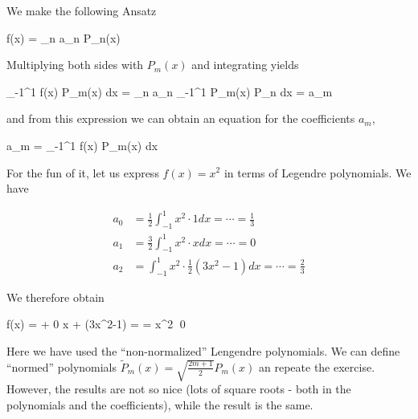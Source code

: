 We make the following Ansatz

\bee
f(x) = \sum_n a_n P_n(x)
\eee

Multiplying both sides with $P_m(x)$ and integrating yields

\bee
\int_{-1}^1 f(x) P_m(x) dx = \sum_n a_n \int_{-1}^1 P_m(x) P_n dx =  a_m
\eee

and from this expression we can obtain an equation for the coefficients $a_m$,

\bee
a_m =  \int_{-1}^1 f(x) P_m(x) dx
\eee

For the fun of it, let us express $f(x)=x^2$ in terms of Legendre polynomials. We have

\begin{align*}
  a_0 &= \frac{1}{2} \int_{-1}^1 x^2 \cdot 1 dx = \cdots = \frac{1}{3}\\
  a_1 &= \frac{3}{2} \int_{-1}^1 x^2 \cdot x dx = \cdots = 0\\
  a_2 &= \int_{-1}^1 x^2 \cdot \frac{1}{2}(3x^2-1) dx = \cdots = \frac{2}{3}
\end{align*}

We therefore obtain

\bee
f(x) =   + 0 \cdot x +  (3x^2-1) = \cdots = x^2 \qed
\eee

Here we have used the ``non-normalized'' Lengendre polynomials. We can define ``normed'' polynomials $\tilde{P}_m(x) = \sqrt{\frac{2m+1}{2}} P_m(x)$ an repeate the exercise. However, the results are not so nice (lots of square roots - both in the polynomials and the coefficients), while the result is the same.



